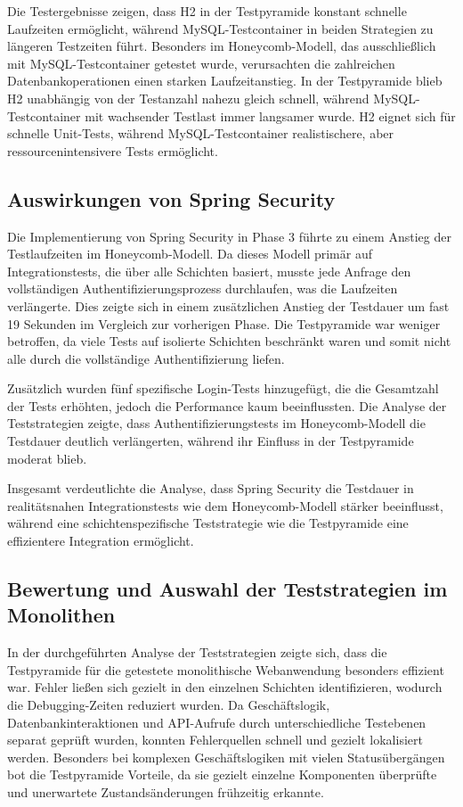 Die Testergebnisse zeigen, dass H2 in der Testpyramide konstant schnelle Laufzeiten ermöglicht, während MySQL-Testcontainer in beiden Strategien zu längeren Testzeiten führt. Besonders im Honeycomb-Modell, das ausschließlich mit MySQL-Testcontainer getestet wurde, verursachten die zahlreichen Datenbankoperationen einen starken Laufzeitanstieg. In der Testpyramide blieb H2 unabhängig von der Testanzahl nahezu gleich schnell, während MySQL-Testcontainer mit wachsender Testlast immer langsamer wurde. H2 eignet sich für schnelle Unit-Tests, während MySQL-Testcontainer realistischere, aber ressourcenintensivere Tests ermöglicht.

\subsection{Auswirkungen von Spring Security}

Die Implementierung von Spring Security in Phase 3 führte zu einem Anstieg der Testlaufzeiten im Honeycomb-Modell. Da dieses Modell primär auf Integrationstests, die über alle Schichten basiert, musste jede Anfrage den vollständigen Authentifizierungsprozess durchlaufen, was die Laufzeiten verlängerte. Dies zeigte sich in einem zusätzlichen Anstieg der Testdauer um fast 19 Sekunden im Vergleich zur vorherigen Phase. Die Testpyramide war weniger betroffen, da viele Tests auf isolierte Schichten beschränkt waren und somit nicht alle durch die vollständige Authentifizierung liefen.

Zusätzlich wurden fünf spezifische Login-Tests hinzugefügt, die die Gesamtzahl der Tests erhöhten, jedoch die Performance kaum beeinflussten. Die Analyse der Teststrategien zeigte, dass Authentifizierungstests im Honeycomb-Modell die Testdauer deutlich verlängerten, während ihr Einfluss in der Testpyramide moderat blieb.

Insgesamt verdeutlichte die Analyse, dass Spring Security die Testdauer in realitätsnahen Integrationstests wie dem Honeycomb-Modell stärker beeinflusst, während eine schichtenspezifische Teststrategie wie die Testpyramide eine effizientere Integration ermöglicht.


\subsection{Bewertung und Auswahl der Teststrategien im Monolithen}
In der durchgeführten Analyse der Teststrategien zeigte sich, dass die Testpyramide für die getestete monolithische Webanwendung besonders effizient war. Fehler ließen sich gezielt in den einzelnen Schichten identifizieren, wodurch die Debugging-Zeiten reduziert wurden. Da Geschäftslogik, Datenbankinteraktionen und API-Aufrufe durch unterschiedliche Testebenen separat geprüft wurden, konnten Fehlerquellen schnell und gezielt lokalisiert werden. Besonders bei komplexen Geschäftslogiken mit vielen Statusübergängen bot die Testpyramide Vorteile, da sie gezielt einzelne Komponenten überprüfte und unerwartete Zustandsänderungen frühzeitig erkannte.

